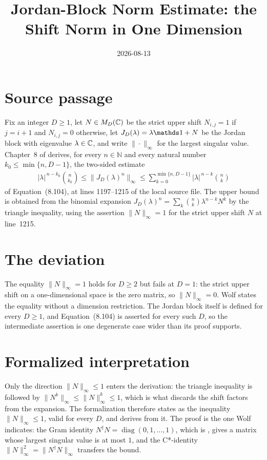 \documentclass{article}
\title{Jordan-Block Norm Estimate: the Shift Norm in One Dimension}
\author{}
\date{2026-08-13}
\begin{document}
\maketitle
{}

\section{Source passage}

Fix an integer $D\ge 1$, let $N\in M_{D}(\mathbb{C})$ be the strict upper shift
$N_{i,j}=1$ if $j=i+1$ and $N_{i,j}=0$ otherwise, let
$J_{D}(\lambda)=\lambda\Id+N$ be the Jordan block with eigenvalue
$\lambda\in\mathbb{C}$, and write $\|\cdot\|_{\infty}$ for the largest singular value.
Chapter~8 of \cite{Wolf2012Quantum} derives, for every $n\in\mathbb N$ and
every natural number $k_{0}\le\min\{n,D-1\}$, the two-sided estimate
\begin{align}
  |\lambda|^{\,n-k_{0}}\binom{n}{k_{0}}
    \le \bigl\|J_{D}(\lambda)^{n}\bigr\|_{\infty}
    \le \sum_{k=0}^{\min\{n,D-1\}}|\lambda|^{\,n-k}\binom{n}{k}
\end{align}
of Equation~(8.104), at lines 1197--1215 of the local source file. The upper
bound is obtained from the binomial expansion
$J_{D}(\lambda)^{n}=\sum_{k}\binom{n}{k}\lambda^{n-k}N^{k}$ by the triangle
inequality, using the assertion $\|N\|_{\infty}=1$ for the strict upper shift
$N$ at line~1215.

\section{The deviation}

The equality $\|N\|_{\infty}=1$ holds for $D\ge 2$ but fails at $D=1$: the
strict upper shift on a one-dimensional space is the zero matrix, so
$\|N\|_{\infty}=0$. Wolf states the equality without a dimension restriction.
The Jordan block itself is defined for every $D\ge 1$, and Equation~(8.104) is
asserted for every such $D$, so the intermediate assertion is one degenerate
case wider than its proof supports.

\section{Formalized interpretation}

Only the direction $\|N\|_{\infty}\le 1$ enters the derivation: the triangle
inequality is followed by
$\|N^{k}\|_{\infty}\le\|N\|_{\infty}^{k}\le 1$, which is what discards the
shift factors from the expansion. The formalization therefore states
 as the inequality
$\|N\|_{\infty}\le 1$, valid for every $D$, and derives
 from it. The proof is the
one Wolf indicates: the Gram identity
$N^{\dagger}N=\operatorname{diag}(0,1,\dots,1)$, which is
, gives a matrix whose
largest singular value is at most $1$, and the C*-identity
$\|N\|_{\infty}^{2}=\|N^{\dagger}N\|_{\infty}$ transfers the bound.
\end{document}
